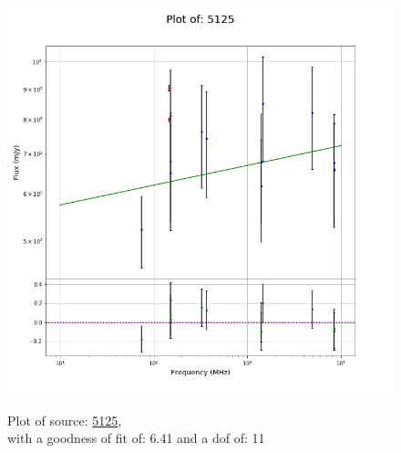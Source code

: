 \documentclass{article}
\begin{document}
\begin{figure}[H]
\begin{minipage}{0.5\textwidth}
        \includegraphics[scale = 0.35]{KmeulenSimSource_1hr/1hr5125.png}
        \captionsetup{labelformat=empty}
        \caption{Plot of source: \href{http://banana.transientskp.org/r4/vlo_KmeulenSimSource/runningcatalog/5125}{5125},\\with a goodness of fit of: 6.41 and a dof of: 11}
    \addtocounter{figure}{-1}
    \label{KmeulenSimSource:1hr:5125:plot}
    \end{minipage}
\end{figure}
\end{document}
